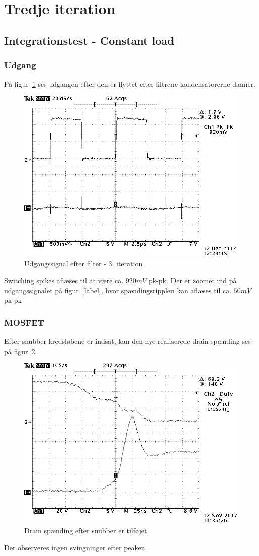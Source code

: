 \section{Tredje iteration}

\subsection{Integrationstest - Constant load}
\subsubsection{Udgang}
På figur~\ref{fig:realisering_udgang_e_filter_3} ses udgangen efter den er flyttet efter filtrene kondensatorerne danner. 
\begin{figure}[H]
	\center
	\includegraphics[max width=0.7\linewidth]{../dokumentation/tex/3iteration/billeder/Realisering/udgang_e_filter_3iteration.png}
	\caption{Udgangssignal efter filter - 3. iteration}
	\label{fig:realisering_udgang_e_filter_3}
\end{figure}
Switching spikes aflæses til at være ca. $920mV$ pk-pk.
Der er zoomet ind på udgangssignalet på figur~\ref{label}, hvor spændingsripplen kan aflæses til ca. $50mV$ pk-pk

\subsubsection{MOSFET}
Efter snubber kredsløbene er indsat, kan den nye realiserede drain spænding ses på figur~\ref{fig:realiseirng_snubber_MOSFET_3} 
\begin{figure}[H]
	\center
	\includegraphics[max width=0.7\linewidth]{../dokumentation/tex/3iteration/billeder/Realisering/Realisering_switch_tid.PNG}
	\caption{Drain spænding efter snubber er tilføjet}
	\label{fig:realiseirng_snubber_MOSFET_3}
\end{figure} 
Der observeres ingen svingninger efter peaken.

